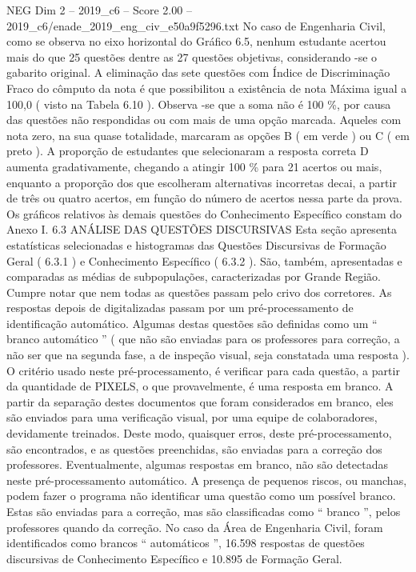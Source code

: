 \begin{textsample}{NEG Dim 2 – 2019\_c6 – Score 2.00 – 2019\_c6/enade\_2019\_eng\_civ\_e50a9f5296.txt}
No caso de Engenharia Civil, como se observa no eixo horizontal do Gráfico 6.5, nenhum estudante acertou mais do que 25 questões dentre as 27 questões objetivas, considerando -se o gabarito original.
A eliminação das sete questões com Índice de Discriminação Fraco do cômputo da nota é que possibilitou a existência de nota Máxima igual a 100,0 ( visto na Tabela 6.10 ).
Observa -se que a soma não é 100 \%, por causa das questões não respondidas ou com mais de uma opção marcada.
Aqueles com nota zero, na sua quase totalidade, marcaram as opções B ( em verde ) ou C ( em preto ).
A proporção de estudantes que selecionaram a resposta correta D aumenta gradativamente, chegando a atingir 100 \% para 21 acertos ou mais, enquanto a proporção dos que escolheram alternativas incorretas decai, a partir de três ou quatro acertos, em função do número de acertos nessa parte da prova.
Os gráficos relativos às demais questões do Conhecimento Específico constam do Anexo I. 6.3 ANÁLISE DAS QUESTÕES DISCURSIVAS Esta seção apresenta estatísticas selecionadas e histogramas das Questões Discursivas de Formação Geral ( 6.3.1 ) e Conhecimento Específico ( 6.3.2 ).
São, também, apresentadas e comparadas as médias de subpopulações, caracterizadas por Grande Região.
Cumpre notar que nem todas as questões passam pelo crivo dos corretores.
As respostas depois de digitalizadas passam por um pré-processamento de identificação automático.
Algumas destas questões são definidas como um “ branco automático ” ( que não são enviadas para os professores para correção, a não ser que na segunda fase, a de inspeção visual, seja constatada uma resposta ).
O critério usado neste pré-processamento, é verificar para cada questão, a partir da quantidade de PIXELS, o que provavelmente, é uma resposta em branco.
A partir da separação destes documentos que foram considerados em branco, eles são enviados para uma verificação visual, por uma equipe de colaboradores, devidamente treinados.
Deste modo, quaisquer erros, deste pré-processamento, são encontrados, e as questões preenchidas, são enviadas para a correção dos professores.
Eventualmente, algumas respostas em branco, não são detectadas neste pré-processamento automático.
A presença de pequenos riscos, ou manchas, podem fazer o programa não identificar uma questão como um possível branco.
Estas são enviadas para a correção, mas são classificadas como “ branco ”, pelos professores quando da correção.
No caso da Área de Engenharia Civil, foram identificados como brancos “ automáticos ”, 16.598 respostas de questões discursivas de Conhecimento Específico e 10.895 de Formação Geral.

\end{textsample}

